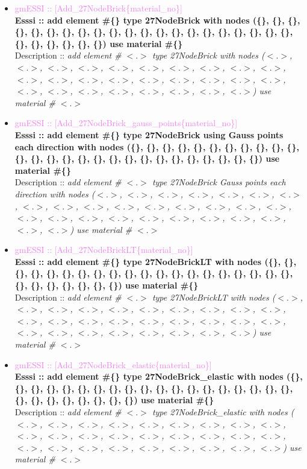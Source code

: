 \documentclass[11pt]{article}
\begin{document}
  \begin{itemize}
  
    \item \textcolor{violet}{gmESSI :: [Add\_27NodeBrick\{material\_no\}]} \\             
    \textbf{Esssi :: add element \#\{\} type 27NodeBrick with nodes (\{\}, \{\}, \{\}, \{\}, \{\}, \{\}, \{\}, \{\}, \{\}, \{\}, \{\}, \{\}, \{\}, \{\}, \{\}, \{\}, \{\}, \{\}, \{\}, \{\}, \{\}, \{\}, \{\}, \{\}, \{\}, \{\}, \{\}) use material \#\{\}}\\
    Description :: \textit{ add element \# $<.>$ type 27NodeBrick with nodes ($<.>$, $<.>$, $<.>$, $<.>$, $<.>$, $<.>$, $<.>$, $<.>$, $<.>$, $<.>$, $<.>$, $<.>$, $<.>$, $<.>$, $<.>$, $<.>$, $<.>$, $<.>$, $<.>$, $<.>$, $<.>$, $<.>$, $<.>$, $<.>$, $<.>$, $<.>$, $<.>$) use material \# $<.>$}

    \item \textcolor{violet}{gmESSI :: [Add\_27NodeBrick\_gauss\_points\{material\_no\}]} \\     
    \textbf{Esssi :: add element \#\{\} type 27NodeBrick using  Gauss points each direction with nodes (\{\}, \{\}, \{\}, \{\}, \{\}, \{\}, \{\}, \{\}, \{\}, \{\}, \{\}, \{\}, \{\}, \{\}, \{\}, \{\}, \{\}, \{\}, \{\}, \{\}, \{\}, \{\}, \{\}, \{\}, \{\}, \{\}, \{\}) use material \#\{\}}\\
    Description :: \textit{ add element \# $<.>$ type 27NodeBrick Gauss points each direction with nodes ($<.>$, $<.>$, $<.>$, $<.>$, $<.>$, $<.>$, $<.>$, $<.>$, $<.>$, $<.>$, $<.>$, $<.>$, $<.>$, $<.>$, $<.>$, $<.>$, $<.>$, $<.>$, $<.>$, $<.>$, $<.>$, $<.>$, $<.>$, $<.>$, $<.>$, $<.>$, $<.>$) use material \# $<.>$}

    \item \textcolor{violet}{gmESSI :: [Add\_27NodeBrickLT\{material\_no\}]} \\           
    \textbf{Esssi :: add element \#\{\} type 27NodeBrickLT with nodes (\{\}, \{\}, \{\}, \{\}, \{\}, \{\}, \{\}, \{\}, \{\}, \{\}, \{\}, \{\}, \{\}, \{\}, \{\}, \{\}, \{\}, \{\}, \{\}, \{\}, \{\}, \{\}, \{\}, \{\}, \{\}, \{\}, \{\}) use material \#\{\}}\\
    Description :: \textit{ add element \# $<.>$ type 27NodeBrickLT with nodes ($<.>$, $<.>$, $<.>$, $<.>$, $<.>$, $<.>$, $<.>$, $<.>$, $<.>$, $<.>$, $<.>$, $<.>$, $<.>$, $<.>$, $<.>$, $<.>$, $<.>$, $<.>$, $<.>$, $<.>$, $<.>$, $<.>$, $<.>$, $<.>$, $<.>$, $<.>$, $<.>$) use material \# $<.>$}

    \item \textcolor{violet}{gmESSI :: [Add\_27NodeBrick\_elastic\{material\_no\}]} \\     
    \textbf{Esssi :: add element \#\{\} type 27NodeBrick\_elastic with nodes (\{\}, \{\}, \{\}, \{\}, \{\}, \{\}, \{\}, \{\}, \{\}, \{\}, \{\}, \{\}, \{\}, \{\}, \{\}, \{\}, \{\}, \{\}, \{\}, \{\}, \{\}, \{\}, \{\}, \{\}, \{\}, \{\}, \{\}) use material \#\{\}}\\
    Description :: \textit{ add element \# $<.>$ type 27NodeBrick\_elastic with nodes ($<.>$, $<.>$, $<.>$, $<.>$, $<.>$, $<.>$, $<.>$, $<.>$, $<.>$, $<.>$, $<.>$, $<.>$, $<.>$, $<.>$, $<.>$, $<.>$, $<.>$, $<.>$, $<.>$, $<.>$, $<.>$, $<.>$, $<.>$, $<.>$, $<.>$, $<.>$, $<.>$) use material \# $<.>$}


\end{itemize}
\end{document}

